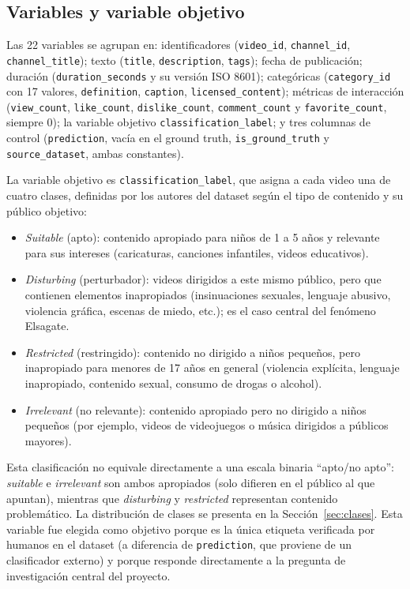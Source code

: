 \documentclass[conference]{IEEEtran}
\begin{document}
\subsection{Variables y variable objetivo}\label{sec:target}
Las 22 variables se agrupan en: identificadores (\texttt{video\_id}, \texttt{channel\_id}, \texttt{channel\_title}); texto (\texttt{title}, \texttt{description}, \texttt{tags}); fecha de publicación; duración (\texttt{duration\_seconds} y su versión ISO 8601); categóricas (\texttt{category\_id} con 17 valores, \texttt{definition}, \texttt{caption}, \texttt{licensed\_content}); métricas de interacción (\texttt{view\_count}, \texttt{like\_count}, \texttt{dislike\_count}, \texttt{comment\_count} y \texttt{favorite\_count}, siempre 0); la variable objetivo \texttt{classification\_label}; y tres columnas de control (\texttt{prediction}, vacía en el ground truth, \texttt{is\_ground\_truth} y \texttt{source\_dataset}, ambas constantes).

La variable objetivo es \texttt{classification\_label}, que asigna a cada video una de cuatro clases, definidas por los autores del dataset según el tipo de contenido y su público objetivo:
\begin{itemize}
\item \textit{Suitable} (apto): contenido apropiado para niños de 1 a 5 años y relevante para sus intereses (caricaturas, canciones infantiles, videos educativos).
\item \textit{Disturbing} (perturbador): videos dirigidos a este mismo público, pero que contienen elementos inapropiados (insinuaciones sexuales, lenguaje abusivo, violencia gráfica, escenas de miedo, etc.); es el caso central del fenómeno Elsagate.
\item \textit{Restricted} (restringido): contenido no dirigido a niños pequeños, pero inapropiado para menores de 17 años en general (violencia explícita, lenguaje inapropiado, contenido sexual, consumo de drogas o alcohol).
\item \textit{Irrelevant} (no relevante): contenido apropiado pero no dirigido a niños pequeños (por ejemplo, videos de videojuegos o música dirigidos a públicos mayores).
\end{itemize}
Esta clasificación no equivale directamente a una escala binaria ``apto/no apto'': \textit{suitable} e \textit{irrelevant} son ambos apropiados (solo difieren en el público al que apuntan), mientras que \textit{disturbing} y \textit{restricted} representan contenido problemático. La distribución de clases se presenta en la Sección~\ref{sec:clases}. Esta variable fue elegida como objetivo porque es la única etiqueta verificada por humanos en el dataset (a diferencia de \texttt{prediction}, que proviene de un clasificador externo) y porque responde directamente a la pregunta de investigación central del proyecto.
\end{document}
